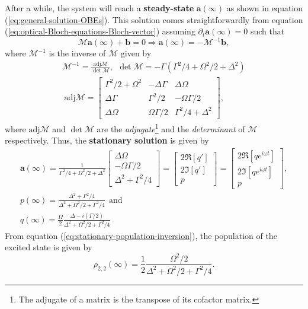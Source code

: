 After a while, the system will reach a \textbf{steady-state} $ \mathbf{a}(\infty) $ as shown in equation (\ref{eq:general-solution-OBEs}). This solution comes straightforwardly from equation (\ref{eq:optical-Bloch-equations-Bloch-vector}) assuming $ \partial_t \mathbf{a}(\infty) = 0 $ such that
\begin{equation}
	\mathcal{M} \mathbf{a}(\infty) + \mathbf{b} = 0 \Rightarrow \mathbf{a}(\infty) = - \mathcal{M}^{-1}\mathbf{b},
\end{equation}
where $ \mathcal{M}^{-1} $ is the inverse of $ \mathcal{M} $ given by
\begin{gather}
	\mathcal{M}^{-1} = \frac{\textrm{adj}\mathcal{M}}{\det \mathcal{M}},\ \ \det\mathcal{M} = -\Gamma (\Gamma^2/4 + \Omega^2 /2 + \Delta^2) \\ \ \textrm{adj}\mathcal{M} =
	\left[ \begin{matrix}
		\Gamma^2 / 2 + \Omega^2 & -\Delta \Gamma & \Delta \Omega  \\
		\Delta \Gamma & \Gamma^2/2 & -\Omega \Gamma/2\\
		\Delta \Omega & \Omega \Gamma/2 & \Gamma^2 / 4 + \Delta^2
	\end{matrix} \right],
\end{gather}
where $ \textrm{adj}\mathcal{M} $ and $ \det \mathcal{M} $ are the \textit{adjugate}\footnote{The adjugate of a matrix is the transpose of its cofactor matrix.} and the \textit{determinant} of $ \mathcal{M} $ respectively. Thus, the \textbf{stationary solution} is given by
\begin{gather}
	\mathbf{a}(\infty) = \frac{1}{\Gamma^2 / 4 + \Omega^2 / 2 + \Delta^2} \left[ \begin{matrix} \Delta \Omega\\ -\Omega \Gamma/2 \\ \Delta^2 + \Gamma^2/4 \end{matrix} \right] = \left[ \begin{matrix} 2 \Re[q'] \\ 2\Im[q'] \\ p \end{matrix} \right] = \left[ \begin{matrix} 2 \Re[qe^{i \omega t}] \\ 2\Im[qe^{i \omega t}] \\ p \end{matrix} \right],
	\label{eq:stationary-solution-OBEs}
	\\
	p(\infty) = \frac{\Delta^2 + \Gamma^2/4}{\Delta^2 + \Omega^2 / 2 + \Gamma^2 / 4}\ \ \textrm{and}
	\label{eq:stationary-population-inversion}
	\\
	q(\infty) = \frac{\Omega}{2} \frac{\Delta - i (\Gamma / 2)}{\Delta^2 + \Omega^2 / 2 + \Gamma^2 / 4}
	\label{eq:stationary-coherence}
\end{gather}
From equation (\ref{eq:stationary-population-inversion}), the population of the excited state is given by
\begin{equation}
	\rho_{2,2}(\infty) = \frac{1}{2}\frac{\Omega^2 / 2}{\Delta^2 + \Omega^2 / 2 + \Gamma^2/4}.
	\label{eq:stationary-excited-state-population}
\end{equation}

